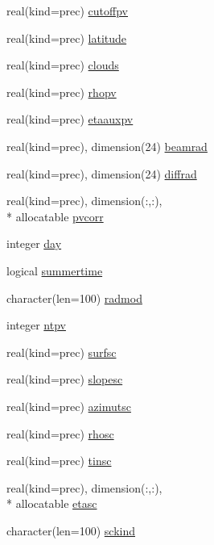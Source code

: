 \begin{DoxyCompactItemize}
real(kind=prec) \hyperlink{classinputvar_ab8f560a60d07ea2ec86b99b42e799877}{cutoffpv}
\item 
real(kind=prec) \hyperlink{classinputvar_aa7a4772c1f679371a4578409bd0e48c5}{latitude}
\item 
real(kind=prec) \hyperlink{classinputvar_a20445ed085b01d2d9787297ac8390cd8}{clouds}
\item 
real(kind=prec) \hyperlink{classinputvar_a912165017f8566044a451c888ab58c60}{rhopv}
\item 
real(kind=prec) \hyperlink{classinputvar_aeb72fc2d7eca7ba95a0fd6dbb0238cf0}{etaauxpv}
\item 
real(kind=prec), dimension(24) \hyperlink{classinputvar_a32edbf52e3022964fd59a2a4d76a6b6d}{beamrad}
\item 
real(kind=prec), dimension(24) \hyperlink{classinputvar_a29749af38c4932d37115166f23b769a3}{diffrad}
\item 
real(kind=prec), dimension(\-:,\-:), \\*
allocatable \hyperlink{classinputvar_aaa751e7b478966be1287687d4899ca3f}{pvcorr}
\item 
integer \hyperlink{classinputvar_af0f2faabf3f021accc56491cdcf43db5}{day}
\item 
logical \hyperlink{classinputvar_aec499a973401b90a01f106d089b0e982}{summertime}
\item 
character(len=100) \hyperlink{classinputvar_a45e665d3fff6479724af6fcb9819f779}{radmod}
\item 
integer \hyperlink{classinputvar_a7aec6c8c1bc131db50a1a7e65f8b0977}{ntpv}
\item 
real(kind=prec) \hyperlink{classinputvar_a8a591d3ec84f2b1c645a06110935e7cd}{surfsc}
\item 
real(kind=prec) \hyperlink{classinputvar_a38a21450f63b87e2e09c5c4eedd3e6ef}{slopesc}
\item 
real(kind=prec) \hyperlink{classinputvar_a55e23291eb7d5495b50199caabe3e529}{azimutsc}
\item 
real(kind=prec) \hyperlink{classinputvar_aac32027dc5d095e6dcb9088dec220274}{rhosc}
\item 
real(kind=prec) \hyperlink{classinputvar_a3c4fd3f3b8a4ef86969e1e9eec3338c8}{tinsc}
\item 
real(kind=prec), dimension(\-:,\-:), \\*
allocatable \hyperlink{classinputvar_abf4e2424b8bd9e57417fa35d19c20a2d}{etasc}
\item 
character(len=100) \hyperlink{classinputvar_a1690adffbcaeb3cbd73051d411d2a376}{sckind}

\end{DoxyCompactItemize}
